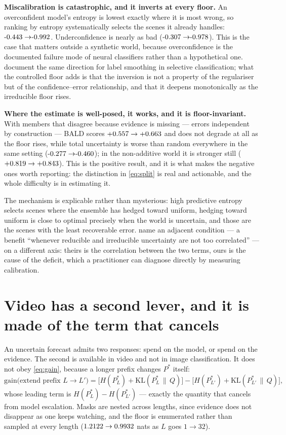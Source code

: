\documentclass[10pt]{article}
\newcommand{\Pstar}{P^{*}}
\newcommand{\KL}[2]{\mathrm{KL}(#1\,\|\,#2)}
\begin{document}
\textbf{Miscalibration is catastrophic, and it inverts at every floor.} An overconfident model's
entropy is lowest exactly where it is most wrong, so ranking by entropy systematically selects the
scenes it already handles: $\MechJOverLo \to \MechJOverHi$. Underconfidence is nearly as bad
($\MechJUnderLo \to \MechJUnderHi$). This is the case that matters outside a synthetic world,
because overconfidence is the documented failure mode of neural classifiers
\citep{guo2017calibration} rather than a hypothetical one. \citet{xia2025label} document the same
direction for label smoothing in selective classification; what the controlled floor adds is that
the inversion is not a property of the regulariser but of the confidence--error relationship, and
that it deepens monotonically as the irreducible floor rises.

\textbf{Where the estimate is well-posed, it works, and it is floor-invariant.} With members that
disagree because evidence is missing --- errors independent by construction --- BALD scores
$+0.557 \to +0.663$ and does not degrade at all as the floor rises, while total
uncertainty is worse than random everywhere in the same setting
($\MechJEnsLo \to \MechJEnsHi$); in the non-additive world it is stronger still
($+0.819 \to +0.843$). This is the positive result, and it is what makes the negative
ones worth reporting: the distinction in \eqref{eq:split} is real and actionable, and the whole
difficulty is in estimating it.

The mechanism is explicable rather than mysterious: high predictive entropy selects scenes where
the ensemble has hedged toward uniform, hedging toward uniform is close to optimal precisely when
the world is uncertain, and those are the scenes with the least recoverable error.
\citet{peale2026flexible} name an adjacent condition --- a benefit ``whenever reducible and
irreducible uncertainty are not too correlated'' --- on a different axis: theirs is the correlation
between the two terms, ours is the cause of the deficit, which a practitioner can diagnose directly
by measuring calibration.

\section{Video has a second lever, and it is made of the term that cancels}
\label{sec:prefix}

An uncertain forecast admits two responses: spend on the model, or spend on the evidence. The
second is available in video and not in image classification. It does not obey \eqref{eq:gain},
because a longer prefix changes $\Pstar$ itself:
%
\begin{equation}
\text{gain(extend prefix } L \to L')
  = \big[H(\Pstar_L) + \KL{\Pstar_L}{Q}\big] - \big[H(\Pstar_{L'}) + \KL{\Pstar_{L'}}{Q}\big],
\label{eq:prefix}
\end{equation}
%
whose leading term is $H(\Pstar_L) - H(\Pstar_{L'})$ --- exactly the quantity that cancels from
model escalation. Masks are nested across lengths, since evidence does not disappear as one keeps
watching, and the floor is enumerated rather than sampled at every length
($1.2122 \to 0.9932$ nats as $L$ goes $1 \to 32$).
\end{document}
